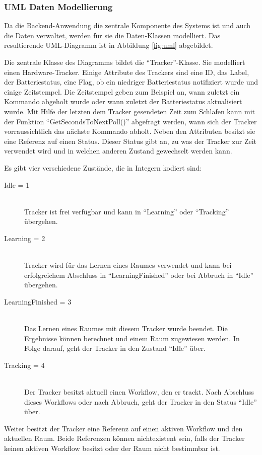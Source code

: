 \subsubsection{UML Daten Modellierung}
Da die Backend-Anwendung die zentrale Komponente des Systems ist und auch die Daten verwaltet, werden für sie die Daten-Klassen modelliert.
Das resultierende UML-Diagramm ist in Abbildung \ref{fig:uml} abgebildet.

Die zentrale Klasse des Diagramms bildet die \enquote{Tracker}-Klasse.
Sie modelliert einen Hardware-Tracker.
Einige Attribute des Trackers sind eine ID, das Label, der Batteriestatus, eine Flag, ob ein niedriger Batteriestatus notifiziert wurde
und einige Zeitstempel.
Die Zeitstempel geben zum Beispiel an, wann zuletzt ein Kommando abgeholt wurde oder wann zuletzt der Batteriestatus aktualisiert wurde.
Mit Hilfe der letzten dem Tracker gesendeten Zeit zum Schlafen kann mit der Funktion \enquote{GetSecondsToNextPoll()} abgefragt werden,
wann sich der Tracker vorraussichtlich das nächste Kommando abholt.
Neben den Attributen besitzt sie eine Referenz auf einen Status.
Dieser Status gibt an, zu was der Tracker zur Zeit verwendet wird und in welchen anderen Zustand gewechselt werden kann.

Es gibt vier verschiedene Zustände, die in Integern kodiert sind:
\begin{description}
	\item[Idle = 1] \hfill \\
		Tracker ist frei verfügbar und kann in \enquote{Learning} oder \enquote{Tracking} übergehen.
	\item[Learning = 2] \hfill \\
		Tracker wird für das Lernen eines Raumes verwendet und kann bei erfolgreichem Abschluss in \enquote{LearningFinished} oder bei Abbruch in \enquote{Idle} übergehen.
	\item[LearningFinished = 3] \hfill \\
		Das Lernen eines Raumes mit diesem Tracker wurde beendet. Die Ergebnisse können berechnet und einem Raum zugewiesen werden. In Folge darauf, geht der Tracker in den Zustand \enquote{Idle} über.
	\item[Tracking = 4] \hfill \\
		Der Tracker besitzt aktuell einen Workflow, den er trackt. Nach Abschluss dieses Workflows oder nach Abbruch, geht der Tracker in den Status \enquote{Idle} über.
\end{description}

Weiter besitzt der Tracker eine Referenz auf einen aktiven Workflow und den aktuellen Raum.
Beide Referenzen können nichtexistent sein, falls der Tracker keinen aktiven Workflow besitzt oder der Raum nicht bestimmbar ist.

